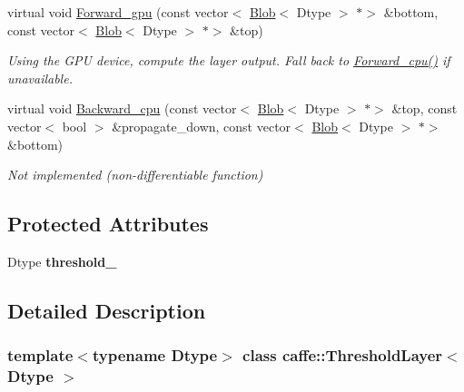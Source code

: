 \begin{DoxyCompactItemize}
\item 
\mbox{\label{classcaffe_1_1_threshold_layer_aded9ca701625d915984c9f5ef754ba66}} 
virtual void \mbox{\hyperlink{classcaffe_1_1_threshold_layer_aded9ca701625d915984c9f5ef754ba66}{Forward\+\_\+gpu}} (const vector$<$ \mbox{\hyperlink{classcaffe_1_1_blob}{Blob}}$<$ Dtype $>$ $\ast$$>$ \&bottom, const vector$<$ \mbox{\hyperlink{classcaffe_1_1_blob}{Blob}}$<$ Dtype $>$ $\ast$$>$ \&top)
\begin{DoxyCompactList}\small\item\em Using the G\+PU device, compute the layer output. Fall back to \mbox{\hyperlink{classcaffe_1_1_threshold_layer_a7aa846dd532cfeb41b09671bd975d120}{Forward\+\_\+cpu()}} if unavailable. \end{DoxyCompactList}\item 
\mbox{\label{classcaffe_1_1_threshold_layer_a5df4d0e3da5e80d83c5853da0f018db6}} 
virtual void \mbox{\hyperlink{classcaffe_1_1_threshold_layer_a5df4d0e3da5e80d83c5853da0f018db6}{Backward\+\_\+cpu}} (const vector$<$ \mbox{\hyperlink{classcaffe_1_1_blob}{Blob}}$<$ Dtype $>$ $\ast$$>$ \&top, const vector$<$ bool $>$ \&propagate\+\_\+down, const vector$<$ \mbox{\hyperlink{classcaffe_1_1_blob}{Blob}}$<$ Dtype $>$ $\ast$$>$ \&bottom)
\begin{DoxyCompactList}\small\item\em Not implemented (non-\/differentiable function) \end{DoxyCompactList}\end{DoxyCompactItemize}
\subsection*{Protected Attributes}
\begin{DoxyCompactItemize}
\item 
\mbox{\label{classcaffe_1_1_threshold_layer_aacbdfb31f685add4d4c9dbfb5444bcad}} 
Dtype {\bfseries threshold\+\_\+}
\end{DoxyCompactItemize}


\subsection{Detailed Description}
\subsubsection*{template$<$typename Dtype$>$\newline
class caffe\+::\+Threshold\+Layer$<$ Dtype $>$}

